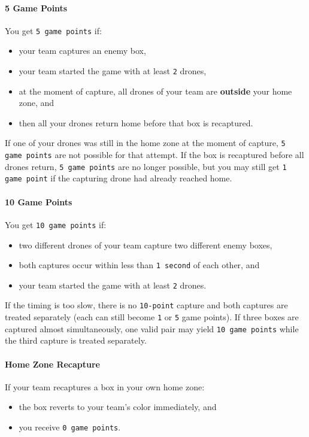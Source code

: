 \paragraph{5 Game Points}
You get \texttt{5 game points} if:
\begin{itemize}
	\item{your team captures an enemy box,}
	\item{your team started the game with at least \texttt{2} drones,}
	\item{at the moment of capture, all drones of your team are \textbf{outside} your home zone, and}
	\item{then all your drones return home before that box is recaptured.}
\end{itemize}

If one of your drones was still in the home zone at the moment of capture, \texttt{5 game points} are not possible for that attempt. If the box is recaptured before all drones return, \texttt{5 game points} are no longer possible, but you may still get \texttt{1 game point} if the capturing drone had already reached home.

\paragraph{10 Game Points}
You get \texttt{10 game points} if:
\begin{itemize}
	\item{two different drones of your team capture two different enemy boxes,}
	\item{both captures occur within less than \texttt{1 second} of each other, and}
	\item{your team started the game with at least \texttt{2} drones.}
\end{itemize}

If the timing is too slow, there is no \texttt{10-point} capture and both captures are treated separately (each can still become \texttt{1} or \texttt{5} game points). If three boxes are captured almost simultaneously, one valid pair may yield \texttt{10 game points} while the third capture is treated separately.

\paragraph{Home Zone Recapture}
If your team recaptures a box in your own home zone:
\begin{itemize}
	\item{the box reverts to your team's color immediately, and}
	\item{you receive \texttt{0 game points}.}
\end{itemize}

